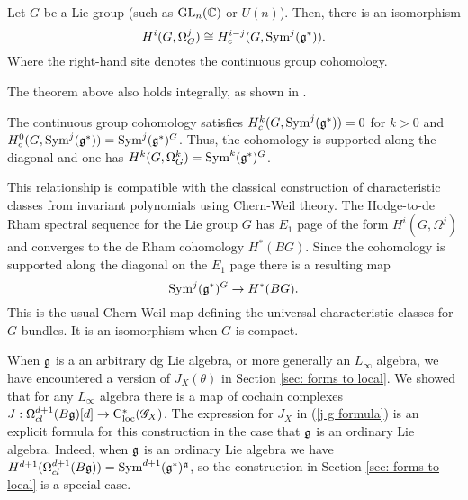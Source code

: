 \documentclass[10pt]{amsart}
\begin{document}
\begin{thm}{\cite{BottBG}}\label{prop: bott} Let $G$ be a Lie group (such as ${\rm GL}_n(\mathbb C)$ or $U(n)$). 
Then, there is an isomorphism 
\[
H^i(G , \Omega^j_G) \cong H^{i-j}_c(G , {\rm Sym}^j (\mathfrak g^*)) .
\] 
Where the right-hand site denotes the continuous group cohomology.
\end{thm} 

\begin{rmk}
The theorem above also holds integrally, as shown in \cite{Totaro}.
\end{rmk}

The continuous group cohomology satisfies $H^k_c(G, {\rm Sym}^j(\mathfrak g^*)) = 0$ for $k > 0$ and $H^0_c(G, {\rm Sym}^j(\mathfrak g^*)) = {\rm Sym}^j(\mathfrak g^*)^G$.
Thus, the cohomology is supported along the diagonal and one has $H^{k}(G, \Omega^k_G) = {\rm Sym}^k(\mathfrak g^*)^G$. 

This relationship is compatible with the classical construction of characteristic classes from invariant polynomials using Chern-Weil theory.
The Hodge-to-de Rham spectral sequence for the Lie group $G$ has $E_1$ page of the form $H^i(G, \Omega^j)$ and converges to the de Rham cohomology $H^*(BG)$. 
Since the cohomology is supported along the diagonal on the $E_1$ page there is a resulting map
\[
{\rm Sym}^j(\mathfrak g^*)^G \to H^*(B G) .
\]
This is the usual Chern-Weil map defining the universal characteristic classes for $G$-bundles.  
It is an isomorphism when $G$ is compact.

\begin{rmk}
When $\mathfrak g$ is a an arbitrary dg Lie algebra, or more generally an $L_\infty$ algebra, we have encountered a version of $J_X(\theta)$ in Section \ref{sec: forms to local}. 
We showed that for any $L_\infty$ algebra there is a map of cochain complexes $J : \Omega^{d+1}_{cl}(B\mathfrak g) [d] \to {\rm C}_{\rm loc}^*(\mathscr G_X)$.
The expression for $J_X$ in (\ref{j g formula}) is an explicit formula for this construction in the case that $\mathfrak g$ is an ordinary Lie algebra.
Indeed, when $\mathfrak g$ is an ordinary Lie algebra we have $H^{d+1} (\Omega^{d+1}_{cl}(B\mathfrak g)) = {\rm Sym}^{d+1}(\mathfrak g^*)^\mathfrak g$, so the construction in Section \ref{sec: forms to local} is a special case.
\end{rmk}

\end{document}
